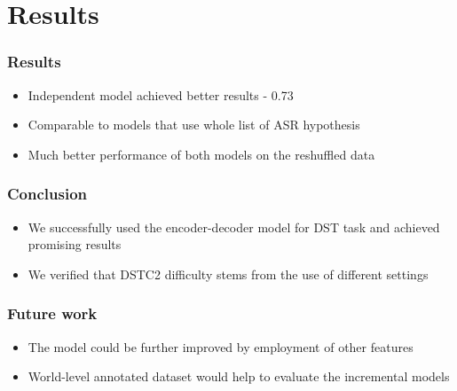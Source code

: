 \section{Results}
\begin{frame}
\frametitle{Results}
\begin{itemize}
\item Independent model achieved better results - 0.73
\item Comparable to models that use whole list of ASR hypothesis
\item Much better performance of both models on the reshuffled data

\end{itemize}
\end{frame}
\begin{frame}
\frametitle{Conclusion}
\begin{itemize}
\item We successfully used the encoder-decoder model for DST task and achieved promising results
\item We verified that DSTC2 difficulty stems from the use of different settings
\end{itemize}
\end{frame}

\begin{frame}
\frametitle{Future work}
\begin{itemize}
\item The model could be further improved by employment of other features
\item World-level annotated dataset would help to evaluate the incremental models
\end{itemize}
\end{frame}